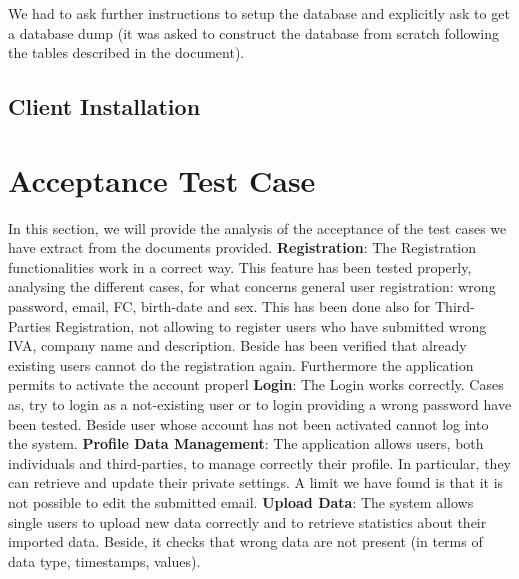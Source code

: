 \documentclass[a4paper]{article}
\begin{document}
We had to ask further instructions to setup the database and explicitly ask to get a database dump (it was asked to construct the database from scratch following the tables described in the document).\\

\subsection{Client Installation}

\newpage
\section{Acceptance Test Case}
In this section, we will provide the analysis of the acceptance of the test cases we have extract from the documents provided. \newline\newline
\textbf{Registration}:\newline
The Registration functionalities work in a correct way. This feature has been tested properly, analysing the different cases, for what concerns general user registration: wrong password, email, FC, birth-date and sex. This has been done also for Third-Parties Registration, not allowing to register users who have submitted wrong IVA, company name and description.\newline
Beside has been verified that already existing users cannot do the registration again. Furthermore the application permits to activate the account properl
\newline\newline
\textbf{Login}:\newline
The Login works correctly. Cases as, try to login as a not-existing user or to login providing a wrong password have been tested. Beside user whose account has not been activated cannot log into the system.
\newline\newline
\textbf{Profile Data Management}:\newline
The application allows users, both individuals and third-parties, to manage correctly their profile. In particular, they can retrieve and update their private settings. A limit we have found is that it is not possible to edit the submitted email.
\newline\newline
\textbf{Upload Data}:\newline
The system allows single users to upload new data correctly and to retrieve statistics about their imported data. Beside, it checks that wrong data  are not present (in terms of data type, timestamps, values). \newline
\end{document}
